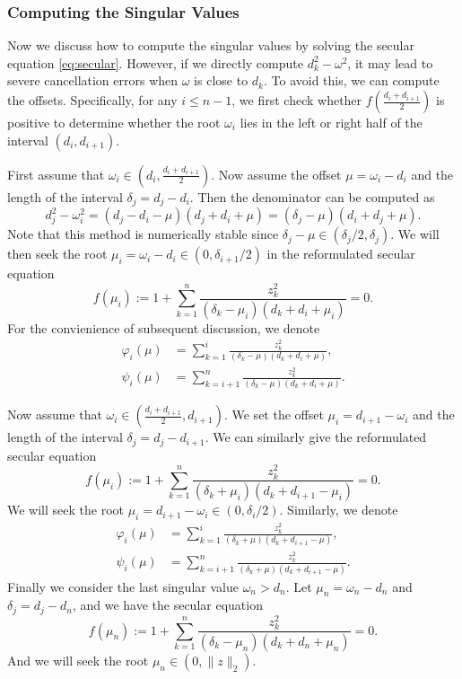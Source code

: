 \documentclass[12pt]{article}
\begin{document}
\subsubsection{Computing the Singular Values}

Now we discuss how to compute the singular values by solving the secular equation \eqref{eq:secular}. However, if we directly compute \(d_k^2 - \omega^2\), it may lead to severe cancellation errors when \(\omega\) is close to \(d_k\). To avoid this, we can compute the offsets. Specifically, for any \(i \leq n - 1\), we first check whether \(f\left(\frac{d_{i} + d_{i+1}}{2}\right)\) is positive to determine whether the root \(\omega_i\) lies in the left or right half of the interval \((d_i, d_{i+1})\).

First assume that \(\omega_i \in \left(d_i, \frac{d_i + d_{i+1}}{2}\right)\). Now assume the offset \(\mu = \omega_i - d_i\) and the length of the interval \(\delta_j = d_j - d_i\). Then the denominator can be computed as
\[
    d_j^2 - \omega_i^2 = (d_j - d_i - \mu)(d_j + d_i + \mu) = (\delta_j - \mu)(d_i + d_j + \mu).
\]
Note that this method is numerically stable since \(\delta_j - \mu \in (\delta_j/2, \delta_j)\). We will then seek the root \(\mu_i = \omega_i - d_i \in (0, \delta_{i+1}/2)\) in the reformulated secular equation
\[
    f(\mu_i) := 1 + \sum_{k=1}^{n} \frac{z_k^2}{( \delta_k - \mu_i)(d_k + d_i + \mu_i)} = 0.
\]
For the convienience of subsequent discussion, we denote
\[
    \begin{aligned}
        \varphi_i(\mu) &= \sum_{k=1}^{i} \frac{z_k^2}{(\delta_k - \mu)(d_k + d_i + \mu)}, \\
        \psi_i(\mu) &= \sum_{k=i+1}^{n} \frac{z_k^2}{(\delta_k - \mu)(d_k + d_i + \mu)}.
    \end{aligned}
\]

Now assume that \(\omega_i \in \left(\frac{d_i + d_{i+1}}{2}, d_{i+1}\right)\). We set the offset \(\mu_i = d_{i+1} - \omega_i\) and the length of the interval \(\delta_j = d_j - d_{i+1}\). We can similarly give the reformulated secular equation
\[
    f(\mu_i) := 1 + \sum_{k=1}^{n} \frac{z_k^2}{( \delta_k + \mu_i)(d_k + d_{i+1} - \mu_i)} = 0.
\]
We will seek the root \(\mu_i = d_{i+1} - \omega_i \in (0, \delta_{i}/2)\). Similarly, we denote
\[
    \begin{aligned}
        \varphi_i(\mu) &= \sum_{k=1}^{i} \frac{z_k^2}{(\delta_k + \mu)(d_k + d_{i+1} - \mu)}, \\
        \psi_i(\mu) &= \sum_{k=i+1}^{n} \frac{z_k^2}{(\delta_k + \mu)(d_k + d_{i+1} - \mu)}.
    \end{aligned}
\]
Finally we consider the last singular value \(\omega_n > d_n\). Let \(\mu_n = \omega_n - d_n\) and \(\delta_j = d_j - d_n\), and we have the secular equation
\[
    f(\mu_n) := 1 + \sum_{k=1}^{n} \frac{z_k^2}{(\delta_k - \mu_n)(d_k + d_n + \mu_n)} = 0.
\]
And we will seek the root \(\mu_n \in (0, \|z\|_2)\).
\end{document}
